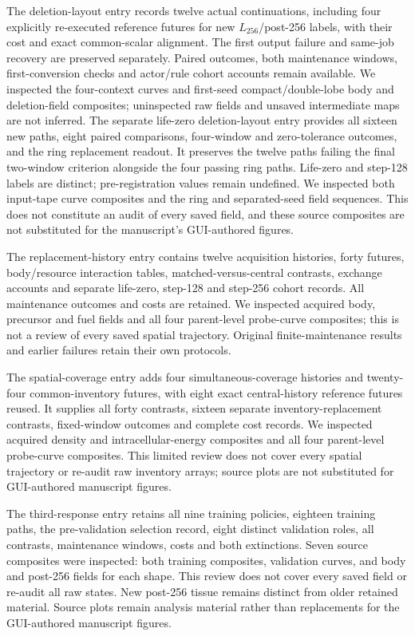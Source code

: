 The deletion-layout entry records twelve actual continuations, including four explicitly re-executed reference futures for new $L_{256}$/post-256 labels, with their cost and exact common-scalar alignment. The first output failure and same-job recovery are preserved separately. Paired outcomes, both maintenance windows, first-conversion checks and actor/rule cohort accounts remain available. We inspected the four-context curves and first-seed compact/double-lobe body and deletion-field composites; uninspected raw fields and unsaved intermediate maps are not inferred.
The separate life-zero deletion-layout entry provides all sixteen new paths, eight paired comparisons, four-window and zero-tolerance outcomes, and the ring replacement readout. It preserves the twelve paths failing the final two-window criterion alongside the four passing ring paths. Life-zero and step-128 labels are distinct; pre-registration values remain undefined. We inspected both input-tape curve composites and the ring and separated-seed field sequences. This does not constitute an audit of every saved field, and these source composites are not substituted for the manuscript's GUI-authored figures.

The replacement-history entry contains twelve acquisition histories, forty futures, body/resource interaction tables, matched-versus-central contrasts, exchange accounts and separate life-zero, step-128 and step-256 cohort records. All maintenance outcomes and costs are retained. We inspected acquired body, precursor and fuel fields and all four parent-level probe-curve composites; this is not a review of every saved spatial trajectory. Original finite-maintenance results and earlier failures retain their own protocols.

The spatial-coverage entry adds four simultaneous-coverage histories and twenty-four common-inventory futures, with eight exact central-history reference futures reused. It supplies all forty contrasts, sixteen separate inventory-replacement contrasts, fixed-window outcomes and complete cost records. We inspected acquired density and intracellular-energy composites and all four parent-level probe-curve composites. This limited review does not cover every spatial trajectory or re-audit raw inventory arrays; source plots are not substituted for GUI-authored manuscript figures.

The third-response entry retains all nine training policies, eighteen training paths, the pre-validation selection record, eight distinct validation roles, all contrasts, maintenance windows, costs and both extinctions. Seven source composites were inspected: both training composites, validation curves, and body and post-256 fields for each shape. This review does not cover every saved field or re-audit all raw states. New post-256 tissue remains distinct from older retained material. Source plots remain analysis material rather than replacements for the GUI-authored manuscript figures.

